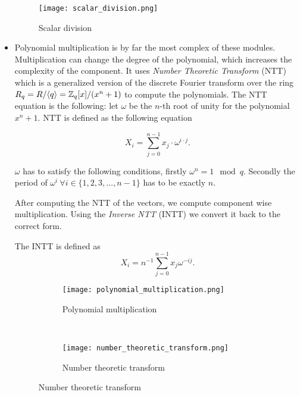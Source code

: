 \begin{itemize}
        \begin{figure}[H]
            \centering
            \texttt{[image: scalar\_division.png]}
            \caption{Scalar division \citep{FPGA_Post_Quantum_Primitives}}
            \label{fig:scalar_div}
        \end{figure}


    \item
        Polynomial multiplication is by far the most complex of these modules.
        Multiplication can change the degree of the polynomial, which increases
        the complexity of the component. It uses \textit{Number Theoretic
        Transform} (NTT) which is a generalized version of the discrete Fourier
        transform over the ring $R_q = R / \langle q \rangle = \mathbb{Z}_q [x] / (x^n
        + 1)$ to compute the polynomials. The NTT equation is the following:
        let $\omega$ be the $n$-th root of unity for the polynomial $x^n + 1$.
        NTT is defined as the following equation

        \[ X_i = \sum^{n-1}_{j=0} x_j \cdot \omega^{i\cdot j}. \]

        $\omega$ has to satisfy the following conditions, firstly
        $\omega^n = 1 \mod q$. Secondly the period of
        $\omega^i \ \forall i \in \{1, 2, 3, \ldots, n - 1\}$ has to be exactly
        $n$.

        After computing the NTT of the vectors, we compute component wise
        multiplication. Using the \textit{Inverse NTT} (INTT) we convert it
        back to the correct form.

        The INTT is defined as \[X_i =
            n^{-1} \sum^{n-1}_{j=0} x_j \omega^{-ij}.\]


        \begin{figure}[H]
            \centering
            \begin{subfigure}[b]{0.4\textwidth}
                \centering
                \texttt{[image: polynomial\_multiplication.png]}
                \caption{Polynomial multiplication \citep{FPGA_Post_Quantum_Primitives}}
                \label{fig:poly_mul}
            \end{subfigure}
            ~
            \begin{subfigure}[b]{0.4\textwidth}
                \centering
                \texttt{[image: number\_theoretic\_transform.png]}
                \caption{Number theoretic transform
                \citep{FPGA_Post_Quantum_Primitives}}
                \label{fig:ntt}
            \end{subfigure}
        \end{figure}

\end{itemize}


